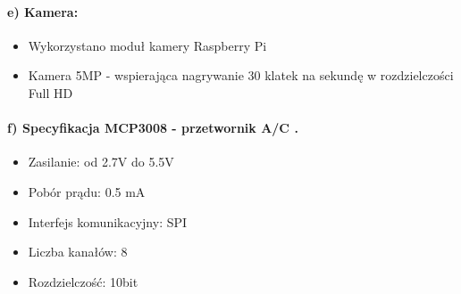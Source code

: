 \documentclass[polish,bachelor,a4paper,oneside]{ppfcmthesis}
\begin{document}
    \paragraph{e) Kamera:}
    \begin{itemize}
        \item Wykorzystano moduł kamery Raspberry Pi
        \item Kamera 5MP - wspierająca nagrywanie 30 klatek na sekundę w rozdzielczości Full HD
    \end{itemize}
    \paragraph{f) Specyfikacja MCP3008 - przetwornik A/C \protect\cite{specyfikacjaAC}.}
    \begin{itemize}
        \item Zasilanie: od 2.7V do 5.5V
        \item Pobór prądu: 0.5 mA
        \item Interfejs komunikacyjny: SPI
        \item Liczba kanałów: 8
        \item Rozdzielczość: 10bit
    \end{itemize}
\end{document}
